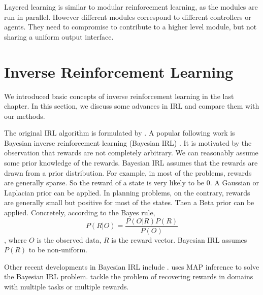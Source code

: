 Layered learning is similar to modular reinforcement learning, as the modules are
run in parallel. However different modules correspond to different controllers
or agents. They need to compromise to contribute to a higher level module, but
not sharing a uniform output interface.

\section{Inverse Reinforcement Learning}

We introduced basic concepts of inverse reinforcement learning in the last
chapter. In this section, we discuss some advances in IRL and compare them with
our methods.

The original IRL algorithm is formulated by
\cite{abbeel2004apprenticeship,ng2000algorithms}. A popular following work is
Bayesian inverse reinforcement learning (Bayesian IRL) \cite{ramachandran2007bayesian}.
It is motivated by the
observation that rewards are not completely arbitrary. We can reasonably assume
some prior knowledge of the rewards. Bayesian IRL assumes that the rewards are
drawn from a prior distribution. 
For example, in most of the problems, rewards are generally sparse. So the
reward of a state is very likely to be 0. A Gaussian or Laplacian prior can be
applied.  In planning problems, on the contrary, rewards are generally small but
positive for most of the states. Then a Beta prior can be applied.
Concretely, according to the Bayes rule,
$$P(R|O) = \frac{P(O|R)P(R)}{P(O)}$$
, where $O$ is the observed data, $R$ is the reward vector. Bayesian IRL assumes
$P(R)$ to be non-uniform.

Other recent developments in Bayesian IRL include
\cite{choi2011map,choi2012nonparametric,dimitrakakis2012bayesian}.
\cite{choi2011map} uses MAP inference to solve the Bayesian IRL problem.
\cite{choi2012nonparametric,dimitrakakis2012bayesian} tackle the problem of
recovering rewards in domains with multiple tasks or multiple rewards. 
